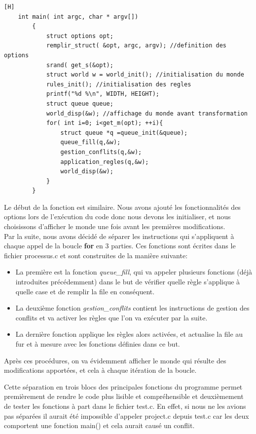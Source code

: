 \documentclass[11pt, a4paper]{article}
\begin{document}
\begin{lstlisting}[frame= single][H]
    int main( int argc, char * argv[])
        {
            struct options opt; 
            remplir_struct( &opt, argc, argv); //definition des options
            srand( get_s(&opt);
            struct world w = world_init(); //initialisation du monde
            rules_init(); //initialisation des regles
            printf("%d %\n", WIDTH, HEIGHT);
            struct queue queue;
            world_disp(&w); //affichage du monde avant transformation
            for( int i=0; i<get_m(opt); ++i){
                struct queue *q =queue_init(&queue);
                queue_fill(q,&w);
                gestion_conflits(q,&w);
                application_regles(q,&w);
                world_disp(&w);
            }
        }
\end{lstlisting}

Le début de la fonction est similaire. Nous avons ajouté les fonctionnalités des options lors de l'exécution du code donc nous devons les initialiser, et nous choisissons d'afficher le monde une fois avant les premières modifications. 
\\ Par la suite, nous avons décidé de séparer les instructions qui s'appliquent à chaque appel de la boucle \textbf{for} en 3 parties. Ces fonctions sont écrites dans le fichier processus.c et sont construites de la manière suivante:
\begin{itemize}
    \item La première est la fonction \textit{queue\_fill}, qui va appeler plusieurs fonctions (déjà introduites précédemment) dans le but de vérifier quelle règle s'applique à quelle case et de remplir la file en conséquent.
    \item La deuxième fonction \textit{gestion\_conflits} contient les instructions de gestion des conflits et va activer les règles que l'on va exécuter par la suite.
    \item La dernière fonction applique les règles alors activées, et actualise la file au fur et à mesure avec les fonctions définies dans ce but.\\
\end{itemize}
Après ces procédures, on va évidemment afficher le monde qui résulte des modifications apportées, et cela à chaque itération de la boucle. 

Cette séparation en trois blocs des principales fonctions du programme permet premièrement de rendre le code plus lisible et compréhensible et deuxièmement de tester les fonctions à part dans le fichier test.c. En effet, si nous ne les avions pas séparées il aurait été impossible d'appeler project.c depuis test.c car les deux comportent une fonction main() et cela aurait causé un conflit. 
\end{document}
